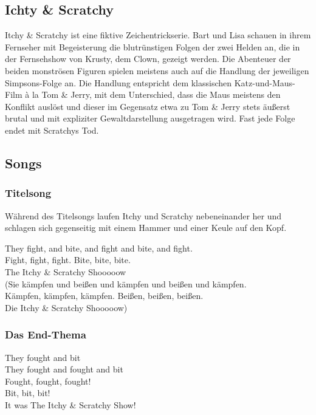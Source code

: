 \begin{appendix}
\section{Ichty \& Scratchy}
Itchy \& Scratchy ist eine fiktive Zeichentrickserie. Bart und Lisa schauen in ihrem Fernseher mit Begeisterung die blutrünstigen Folgen der zwei Helden an, die in der Fernsehshow von Krusty, dem Clown, gezeigt werden. Die Abenteuer der beiden monströsen Figuren spielen meistens auch auf die Handlung der jeweiligen Simpsons-Folge an.
Die Handlung entspricht dem klassischen Katz-und-Maus-Film à la Tom \& Jerry, mit dem Unterschied, dass die Maus meistens den Konflikt auslöst und dieser im Gegensatz etwa zu Tom \& Jerry stets äußerst brutal und mit expliziter Gewaltdarstellung ausgetragen wird. Fast jede Folge endet mit Scratchys Tod.

\subsection{Songs}

\subsubsection{Titelsong}
Während des Titelsongs laufen Itchy und Scratchy nebeneinander her und schlagen sich gegenseitig mit einem Hammer und einer Keule auf den Kopf.

\begin{lyricquote}
	  They fight, and bite, and fight and bite, and fight.\\
    Fight, fight, fight. Bite, bite, bite.\\
    The Itchy \& Scratchy Shooooow\\

    (Sie kämpfen und beißen und kämpfen und beißen und kämpfen.\\
    Kämpfen, kämpfen, kämpfen. Beißen, beißen, beißen.\\
    Die Itchy \& Scratchy Shooooow) 
\end{lyricquote}


\subsubsection{Das End-Thema}

\begin{lyricquote}
	  They fought and bit\\
		They fought and fought and bit\\
		Fought, fought, fought!\\
		Bit, bit, bit!\\
		It was The Itchy \& Scratchy Show!\\


\end{lyricquote}
\end{appendix}
